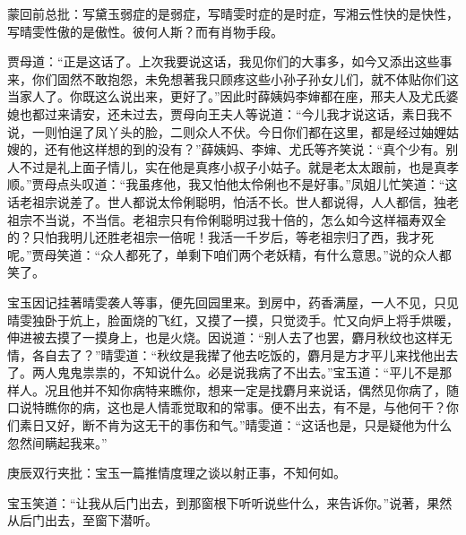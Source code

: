 \begin{parag}

    \begin{note}蒙回前总批：写黛玉弱症的是弱症，写晴雯时症的是时症，写湘云性快的是快性，写晴雯性傲的是傲性。彼何人斯？而有肖物手段。\end{note}
\end{parag}

\begin{parag}

    贾母道：“正是这话了。上次我要说这话，我见你们的大事多，如今又添出这些事来，你们固然不敢抱怨，未免想著我只顾疼这些小孙子孙女儿们，就不体贴你们这当家人了。你既这么说出来，更好了。”因此时薛姨妈李婶都在座，邢夫人及尤氏婆媳也都过来请安，还未过去，贾母向王夫人等说道：“今儿我才说这话，素日我不说，一则怕逞了凤丫头的脸，二则众人不伏。今日你们都在这里，都是经过妯娌姑嫂的，还有他这样想的到的没有？”薛姨妈、李婶、尤氏等齐笑说：“真个少有。别人不过是礼上面子情儿，实在他是真疼小叔子小姑子。就是老太太跟前，也是真孝顺。”贾母点头叹道：“我虽疼他，我又怕他太伶俐也不是好事。”凤姐儿忙笑道：“这话老祖宗说差了。世人都说太伶俐聪明，怕活不长。世人都说得，人人都信，独老祖宗不当说，不当信。老祖宗只有伶俐聪明过我十倍的，怎么如今这样福寿双全的？只怕我明儿还胜老祖宗一倍呢！我活一千岁后，等老祖宗归了西，我才死呢。”贾母笑道：“众人都死了，单剩下咱们两个老妖精，有什么意思。”说的众人都笑了。
\end{parag}


\begin{parag}


    宝玉因记挂著晴雯袭人等事，便先回园里来。到房中，药香满屋，一人不见，只见晴雯独卧于炕上，脸面烧的飞红，又摸了一摸，只觉烫手。忙又向炉上将手烘暖，伸进被去摸了一摸身上，也是火烧。因说道：“别人去了也罢，麝月秋纹也这样无情，各自去了？”晴雯道：“秋纹是我撵了他去吃饭的，麝月是方才平儿来找他出去了。两人鬼鬼祟祟的，不知说什么。必是说我病了不出去。”宝玉道：“平儿不是那样人。况且他并不知你病特来瞧你，想来一定是找麝月来说话，偶然见你病了，随口说特瞧你的病，这也是人情乖觉取和的常事。便不出去，有不是，与他何干？你们素日又好，断不肯为这无干的事伤和气。”晴雯道：“这话也是，只是疑他为什么忽然间瞒起我来。”\begin{note}庚辰双行夹批：宝玉一篇推情度理之谈以射正事，不知何如。\end{note}宝玉笑道：“让我从后门出去，到那窗根下听听说些什么，来告诉你。”说著，果然从后门出去，至窗下潜听。
\end{parag}


